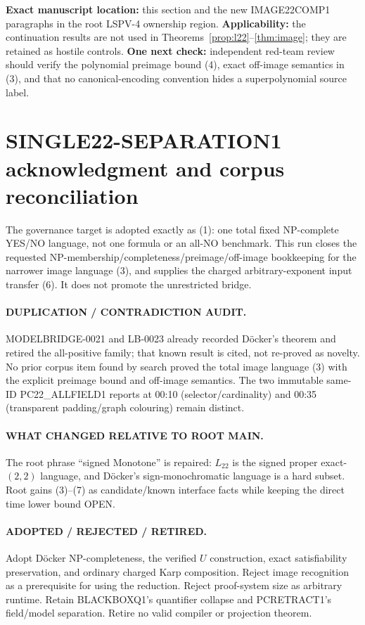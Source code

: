 \documentclass[11pt]{article}
\newcommand{\Ltwo}{L_{22}}
\begin{document}
\textbf{Exact manuscript location:} this section and the new IMAGE22COMP1
paragraphs in the root LSPV-4 ownership region.  \textbf{Applicability:} the
continuation results are not used in Theorems~\ref{prop:l22}--\ref{thm:image};
they are retained as hostile controls.  \textbf{One next check:} independent
red-team review should verify the polynomial preimage bound (4), exact
off-image semantics in (3), and that no canonical-encoding convention hides a
superpolynomial source label.

\section{SINGLE22-SEPARATION1 acknowledgment and corpus reconciliation}
The governance target is adopted exactly as (1): one total fixed NP-complete
YES/NO language, not one formula or an all-NO benchmark.  This run closes the
requested NP-membership/completeness/preimage/off-image bookkeeping for the
narrower image language (3), and supplies the charged arbitrary-exponent
input transfer (6).  It does not promote the unrestricted bridge.

\paragraph{DUPLICATION / CONTRADICTION AUDIT.}
MODELBRIDGE-0021 and LB-0023 already recorded D\"ocker's theorem and retired
the all-positive family; that known result is cited, not re-proved as novelty.
No prior corpus item found by search proved the total image language (3) with
the explicit preimage bound and off-image semantics.  The two immutable
same-ID PC22\_ALLFIELD1 reports at 00:10 (selector/cardinality) and 00:35
(transparent padding/graph colouring) remain distinct.

\paragraph{WHAT CHANGED RELATIVE TO ROOT MAIN.}
The root phrase ``signed Monotone'' is repaired: $\Ltwo$ is the signed proper
exact-$(2,2)$ language, and D\"ocker's sign-monochromatic language is a hard
subset.  Root gains (3)--(7) as candidate/known interface facts while keeping
the direct time lower bound OPEN.

\paragraph{ADOPTED / REJECTED / RETIRED.}
Adopt D\"ocker NP-completeness, the verified $U$ construction, exact
satisfiability preservation, and ordinary charged Karp composition.  Reject
image recognition as a prerequisite for using the reduction.  Reject
proof-system size as arbitrary runtime.  Retain BLACKBOXQ1's quantifier
collapse and PCRETRACT1's field/model separation.  Retire no valid compiler or
projection theorem.
\end{document}
